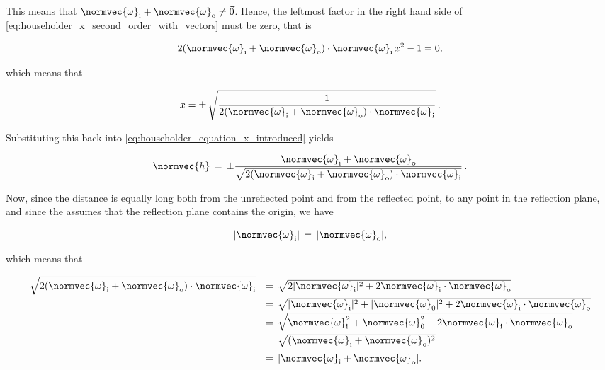 This means that $\normvec{\omega}_{\text{i}} + \normvec{\omega}_{\text{o}} \neq \vec{0}$. Hence, the leftmost factor in the right hand side of \eqref{eq:householder_x_second_order_with_vectors} must be zero, that is

\begin{equation}
2(\normvec{\omega}_{\text{i}} + \normvec{\omega}_{\text{o}})\cdot\normvec{\omega}_{\text{i}}\,x^2 - 1 = 0,
\end{equation}

which means that

\begin{equation}
x = \pm\,\sqrt{\frac{1}{2(\normvec{\omega}_{\text{i}} + \normvec{\omega}_{\text{o}})\cdot\normvec{\omega}_{\text{i}}}}\,.
\end{equation}

Substituting this back into \eqref{eq:householder_equation_x_introduced} yields

\begin{equation} \label{eq:householder_equation_x_replaced}
\normvec{h} \,=\, \pm\frac{\normvec{\omega}_{\text{i}} + \normvec{\omega}_{\text{o}}}{\sqrt{2(\normvec{\omega}_{\text{i}} + \normvec{\omega}_{\text{o}})\cdot\normvec{\omega}_{\text{i}}}}\,.
\end{equation}

Now, since the distance is equally long both from the unreflected point and from the reflected point, to any point in the reflection plane, and since the  assumes that the reflection plane contains the origin, we have

\begin{equation}
|\normvec{\omega}_{\text{i}}| \,=\, |\normvec{\omega}_{\text{o}}|,
\end{equation}

which means that

\begin{equation}
\renewcommand*{\arraystretch}{1.5}
\begin{array}{rl}
\displaystyle \sqrt{2(\normvec{\omega}_{\text{i}} + \normvec{\omega}_{\text{o}})\cdot\normvec{\omega}_{\text{i}}} & =\, \sqrt{2|\normvec{\omega}_{\text{i}}|^2 + 2\normvec{\omega}_{\text{i}}\cdot \normvec{\omega}_{\text{o}}} \\
\displaystyle & =\, \sqrt{|\normvec{\omega}_{\text{i}}|^2 + |\normvec{\omega}_{\text{0}}|^2 + 2\normvec{\omega}_{\text{i}}\cdot \normvec{\omega}_{\text{o}}} \\
\displaystyle & =\, \sqrt{\normvec{\omega}_{\text{i}}^2 + \normvec{\omega}_{\text{0}}^2 + 2\normvec{\omega}_{\text{i}}\cdot \normvec{\omega}_{\text{o}}} \\
\displaystyle & =\, \sqrt{(\normvec{\omega}_{\text{i}}+\normvec{\omega}_{\text{o}})^2} \\
\displaystyle & =\, |\normvec{\omega}_{\text{i}}+\normvec{\omega}_{\text{o}}|.
\end{array}
\end{equation}

